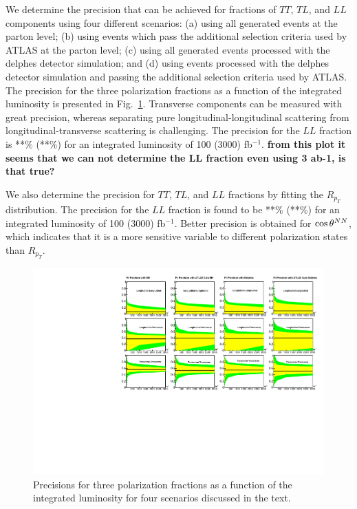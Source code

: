 We determine the precision that can be achieved for fractions of $TT$, $TL$, and $LL$ components using four different scenarios: (a) using all  generated events at the parton level; 
(b) using events which pass the additional selection criteria used by ATLAS at the parton level; 
(c) using all generated events processed with the {\sc delphes} detector simulation; and (d) using events processed with the {\sc delphes} detector simulation and passing the additional selection criteria used by ATLAS. 
The precision for the three polarization fractions as a function of the integrated luminosity is presented in Fig.~\ref{fig:sensitivity}. 
 Transverse components can be measured with great precision, whereas separating pure longitudinal-longitudinal scattering from longitudinal-transverse scattering is challenging.
The precision for the $LL$ fraction is **\% (**\%) for an integrated luminosity of 100 (3000) fb$^{-1}$. {\bf from this plot it seems that we can not determine the LL fraction even using 3 ab-1, is that true?}

We also determine the precision  for $TT$, $TL$, and $LL$ fractions by fitting the $R_{p_T}$ distribution. 
The precision for the $LL$ fraction is found to be **\% (**\%) for an integrated luminosity of 100 (3000) fb$^{-1}$.
Better precision is obtained for $ \cos \theta^{NN}  $, which indicates that it is a more sensitive variable to different polarization states than $R_{p_T}$.

\begin{figure}
\includegraphics[width=.9\textwidth]{./fig/12_LL_LT_TT.pdf}
\caption{ \label{fig:sensitivity} Precisions for three polarization fractions as a function of the integrated luminosity for four scenarios discussed in the text.}
\end{figure}

